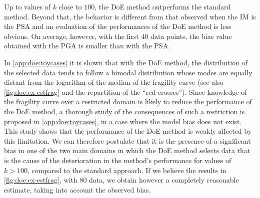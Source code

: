 {Up to values of $k$ close to $100$, the DoE method outperforms the standard method. Beyond that, the behavior is different from that observed when the IM is the PSA and an evaluation of the performances of the DoE method is less obvious. On average, however, with the first $40$ data points, the bias value obtained with the PGA is smaller than with the PSA.}


{In \cref{app:doe:toycases} it is shown that with the DoE method, the distribution of the selected data tends to follow 
a bimodal distribution whose modes are equally distant from the logarithm of the median of the fragility curve
(see also  \cref{fig:doe:ex-estfrag} and the repartition of the ``red crosses''). Since knowledge of the fragility curve over a restricted domain is likely to reduce the performance of the DoE method, a thorough study of the consequences of such a restriction is proposed in \cref{app:doe:toycases}, in a case where the model bias does not exist. This study shows that the performance of the DoE method is weakly affected by this limitation. We can therefore postulate that it is the presence of a significant bias in one of the two main domains in which the DoE method selects data that is the cause of the deterioration in the method's performance for values of $k > 100$, compared to the standard approach. If we believe the results in  \cref{fig:doe:ex-estfrag}, with $80$ data, we obtain however a completely reasonable estimate, taking into account the observed bias.}

